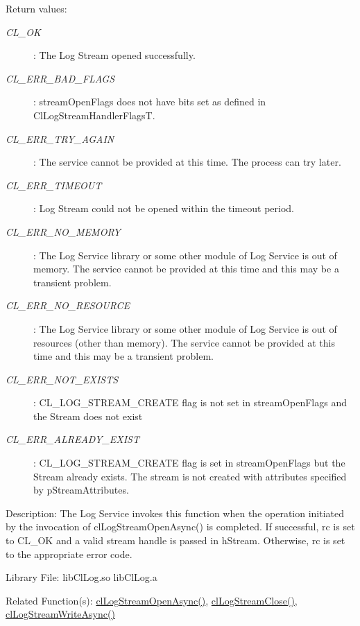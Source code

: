 \begin{flushleft}
\begin{Desc}
\end{Desc}
\begin{Desc}
\item[Return values:] 
\begin{description}
\item[{\em CL\_\-OK}]: The Log Stream opened successfully.
\item[{\em CL\_\-ERR\_\-BAD\_\-FLAGS}]: streamOpenFlags does not have bits set as defined in ClLogStreamHandlerFlagsT.
\item[{\em CL\_\-ERR\_\-TRY\_\-AGAIN}]: The service cannot be provided at this time. The process can try later.
\item[{\em CL\_\-ERR\_\-TIMEOUT}]: Log Stream could not be opened within the timeout period.
\item[{\em CL\_\-ERR\_\-NO\_\-MEMORY}]: The Log Service library or some other module of Log Service is out of memory. The service cannot 
be provided at this time and this may be a transient problem.
\item[{\em CL\_\-ERR\_\-NO\_\-RESOURCE}]: The Log Service library or some other module of Log Service is out of resources 
(other than memory). The service cannot be provided at this time and this may be a transient problem.
\item[{\em CL\_\-ERR\_\-NOT\_\-EXISTS}]: CL\_\-LOG\_\-STREAM\_\-CREATE flag is not set in streamOpenFlags and the Stream does not exist
\item[{\em CL\_\-ERR\_\-ALREADY\_\-EXIST}]: CL\_\-LOG\_\-STREAM\_\-CREATE flag is set in streamOpenFlags but the Stream already exists. The stream is
not created with attributes specified by pStreamAttributes.
\end{description}
\end{Desc}
\begin{Desc}
\item[Description:] The Log Service invokes this function when the operation initiated by the invocation of clLogStreamOpenAsync() is completed.
If successful, rc is set to CL\_\-OK and a valid stream handle is passed in hStream. Otherwise, rc is set to the appropriate error code.
\end{Desc}
\begin{Desc}
\item[Library File:] libClLog.so
\newline
libClLog.a
\end{Desc}
\begin{Desc}
\item[Related Function(s):]\hyperlink{pagelog106}{clLogStreamOpenAsync()}, \hyperlink{pagelog108}{clLogStreamClose()}, 
\hyperlink{pagelog109}{clLogStreamWriteAsync()}\end{Desc}	
\newpage




\end{flushleft}

